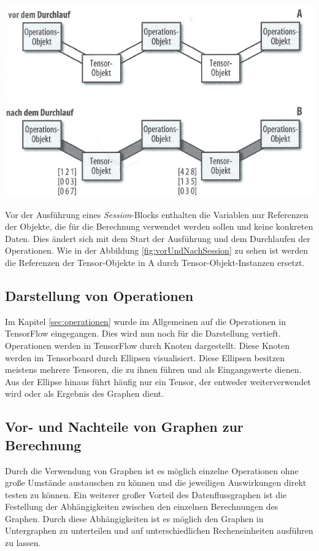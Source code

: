 \begin{center}
\includegraphics[width=.6\textwidth]{../abbildungen/3-4.pdf}
	\label{fig:vorUndNachSession}
\end{center}
Vor der Ausführung eines \textit{Session}-Blocks enthalten die Variablen nur Referenzen der Objekte, die für die Berechnung verwendet werden sollen und keine konkreten Daten. Dies ändert sich mit dem Start der Ausführung und dem Durchlaufen der Operationen. Wie in der Abbildung \ref{fig:vorUndNachSession} zu sehen ist werden die Referenzen der Tensor-Objekte in A durch Tensor-Objekt-Instanzen ersetzt.

\subsection{Darstellung von Operationen}
\label{sec:darstellungOperationen}
Im Kapitel \ref{sec:operationen} wurde im Allgemeinen auf die Operationen in TensorFlow eingegangen. Dies wird nun noch für die Darstellung vertieft. Operationen werden in TensorFlow durch Knoten dargestellt. Diese Knoten werden im Tensorboard durch Ellipsen visualisiert. Diese Ellipsen besitzen meistens mehrere Tensoren, die zu ihnen führen und als Eingangswerte dienen. Aus der Ellipse hinaus führt häufig nur ein Tensor, der entweder weiterverwendet wird oder als Ergebnis des Graphen dient. 


\subsection{Vor- und Nachteile von Graphen zur Berechnung}
\label{sec:vorUndNachteile}
Durch die Verwendung von Graphen ist es möglich einzelne Operationen ohne große Umstände austauschen zu können und die jeweiligen Auswirkungen direkt testen zu können. Ein weiterer großer Vorteil des Datenflussgraphen ist die Festellung der Abhängigkeiten zwischen den einzelnen Berechnungen des Graphen. Durch diese Abhängigkeiten ist es möglich den Graphen in Untergraphen zu unterteilen und auf unterschiedlichen Recheneinheiten ausführen zu lassen. 

